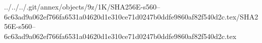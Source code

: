 ../../../.git/annex/objects/9z/1K/SHA256E-s560--6c63ad9a062ef766fa6531a04620d1e310ce71d0247b0ddfe9860af82f540d2c.tex/SHA256E-s560--6c63ad9a062ef766fa6531a04620d1e310ce71d0247b0ddfe9860af82f540d2c.tex